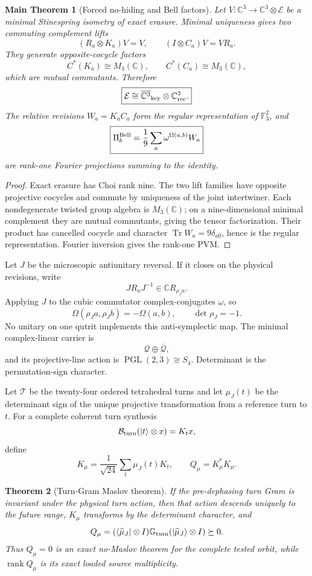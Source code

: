 \documentclass[11pt,oneside,openany]{book}
\numberwithin{equation}{chapter}
\newtheorem{theorem}{Theorem}[chapter]
\newtheorem{maintheorem}[theorem]{Main Theorem}
\theoremstyle{definition}
\theoremstyle{remark}
\newcommand{\C}{\mathbb C}
\newcommand{\Tr}{\operatorname{Tr}}
\newcommand{\rank}{\operatorname{rank}}
\newcommand{\Fthree}{\mathbb F_3}
\begin{document}
\begin{maintheorem}[Forced no-hiding and Bell factors]
\label{thm:v6-no-hiding}
Let \(V:\C^3\to\C^3\otimes\mathcal E\) be a minimal Stinespring isometry of exact
erasure.  Minimal uniqueness gives two commuting complement lifts
\[
 (R_a\otimes K_a)V=V,\qquad(I\otimes C_a)V=VR_a.
\]
They generate opposite-cocycle factors
\[
 C^*(K_a)\cong M_3(\C),\qquad C^*(C_a)\cong M_3(\C),
\]
which are mutual commutants.  Therefore
\[
 \boxed{\mathcal E\cong\overline{\C^3}_{\rm key}\otimes\C^3_{\rm rec}.}
\]
The relative revisions \(W_a=K_aC_a\) form the regular representation of
\(\Fthree^2\), and
\[
 \boxed{\Pi_b^{\rm Bell}
 =\frac{1}{9}\sum_a\omega^{\Omega(a,b)}W_a}
\]
are rank-one Fourier projections summing to the identity.
\end{maintheorem}

\begin{proof}
Exact erasure has Choi rank nine.  The two lift families have opposite
projective cocycles and commute by uniqueness of the joint intertwiner.  Each
nondegenerate twisted group algebra is \(M_3(\C)\); on a nine-dimensional
minimal complement they are mutual commutants, giving the tensor
factorization.  Their product has cancelled cocycle and character
\(\Tr W_a=9\delta_{a0}\), hence is the regular representation.  Fourier
inversion gives the rank-one PVM.
\end{proof}

Let \(J\) be the microscopic antiunitary reversal.  If it closes on the physical
revisions, write
\[
 JR_aJ^{-1}\in\C R_{\rho_Ja}.
\]
Applying \(J\) to the cubic commutator complex-conjugates \(\omega\), so
\[
 \Omega(\rho_Ja,\rho_Jb)=-\Omega(a,b),\qquad \det\rho_J=-1.
\]
No unitary on one qutrit implements this anti-symplectic map.  The minimal
complex-linear carrier is
\[
 \boxed{\mathcal Q\oplus\overline{\mathcal Q}},
\]
and its projective-line action is \(\operatorname{PGL}(2,3)\cong S_4\).  Determinant is the
permutation-sign character.

Let \(\mathcal T\) be the twenty-four ordered tetrahedral turns and let
\(\mu_J(t)\) be the determinant sign of the unique projective transformation from
a reference turn to \(t\).  For a complete coherent turn synthesis
\[
 \mathcal B_{\rm turn}(|t\rangle\otimes x)=K_tx,
\]
define
\[
 \boxed{K_\mu=\frac{1}{\sqrt{24}}\sum_t\mu_J(t)K_t,
 \qquad Q_\mu=K_\mu^*K_\mu.}
\]

\begin{theorem}[Turn-Gram Maslov theorem]
\label{thm:v6-maslov}
If the pre-dephasing turn Gram is invariant under the physical turn action,
then that action descends uniquely to the future range, \(K_\mu\) transforms by
the determinant character, and
\[
 Q_\mu=( \langle\widehat\mu_J|\otimes I)
 \mathbb G_{\rm turn}(|\widehat\mu_J\rangle\otimes I)\succeq0.
\]
Thus \(Q_\mu=0\) is an exact no-Maslov theorem for the complete tested orbit,
while \(\rank Q_\mu\) is its exact loaded source multiplicity.
\end{theorem}
\end{document}
